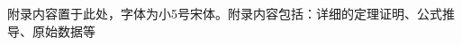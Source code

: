 \documentclass{cjc}
\begin{document}





\appendix

\section{}

附录内容置于此处，字体为小5号宋体。附录内容包括：详细的定理证明、公式推导、原始数据等










\end{document}
